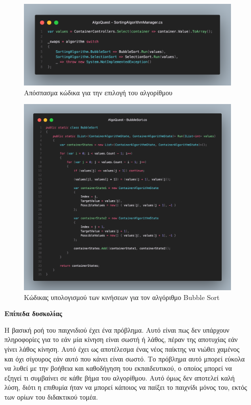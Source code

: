 \begin{figure}[H]
    \centering
    \includegraphics[width=0.8\linewidth]{sections/4/2/images/unity_code_sorting_algorithm_manager_algorithm_selection}
    \caption{Απόσπασμα κώδικα για την επιλογή του αλγορίθμου}
    \label{fig:unity_code_sorting_algorithm_manager_algorithm_selection}
\end{figure}

\begin{figure}[H]
    \centering
    \includegraphics[width=0.8\linewidth]{sections/4/2/images/unity_code_bubble_sort}
    \caption{Κώδικας υπολογισμού των κινήσεων για τον αλγόριθμο Bubble Sort}
    \label{fig:unity_code_bubble_sort}
\end{figure}

\textbf{Επίπεδα δυσκολίας}

Η βασική ροή του παιχνιδιού έχει ένα πρόβλημα. Αυτό είναι πως δεν υπάρχουν πληροφορίες για το εάν μία κίνηση είναι σωστή ή λάθος, πέραν της αποτυχίας εάν γίνει λάθος κίνηση. Αυτό έχει ως αποτέλεσμα ένας νέος παίκτης να νιώθει χαμένος και όχι σίγουρος εάν αυτό που κάνει είναι σωστό. Το πρόβλημα αυτό μπορεί εύκολα να λυθεί με την βοήθεια και καθοδήγηση του εκπαιδευτικού, ο οποίος μπορεί να εξηγεί τι συμβαίνει σε κάθε βήμα του αλγορίθμου. Αυτό όμως δεν αποτελεί καλή λύση, διότι η επιθυμία ήταν να μπορεί κάποιος να παίξει το παιχνίδι μόνος του, εκτός των ορίων του διδακτικού τομέα.

